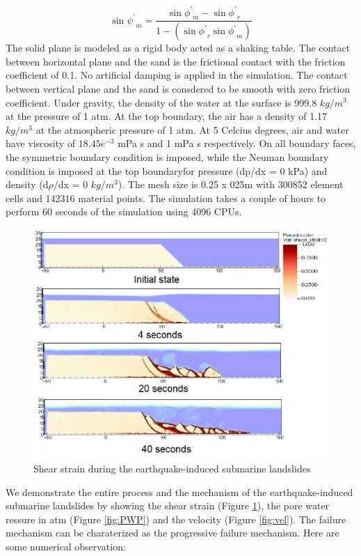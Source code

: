 \documentclass[preprint,12pt]{elsarticle}
\begin{document}
%
%
\begin{equation}
  \sin{\psi^\prime}_m = \frac{\sin{\phi^\prime}_m - \sin{\phi^\prime}_{r}}{1 - (\sin{\phi^\prime}_{r}\sin{\phi^\prime}_m)}
\end {equation}
%
%
The solid plane is modeled as a rigid body acted as a shaking table. The contact between horizontal plane and the sand is the frictional contact with the friction coefficient of 0.1. No artificial damping is applied in the simulation. The contact between vertical plane and the sand is consdered to be smooth with zero friction coefficient. Under gravity, the density of the water at the surface is 999.8 $kg/m^3$ at the pressure of 1 atm. At the top boundary, the air has a density of 1.17 $kg/m^3$ at the atmospheric pressure of 1 atm. At 5 Celcius degrees, air and water have viscosity of $18.45e^{-3}$  mPa s and 1  mPa s respectively. On all boundary faces, the symmetric boundary condition is imposed, while the Neuman boundary condition is imposed at the top boundaryfor pressure (dp/dx = 0 kPa) and density (d$\rho$/dx = 0 $kg/m^3$). The mesh size is 0.25 x 025m with 300852 element cells and 142316 material points. The simulation takes a couple of hours to perform 60 seconds of the simulation using 4096 CPUs. \\
%
\begin{figure}[H]
\center
\includegraphics[scale=0.5]{landslide_gamma.jpeg}
\caption{Shear strain during the earthquake-induced submarine landslides}
\label{fig:gamma}
\end {figure}
%
%
We demonstrate the entire process and the mechanism of the earthquake-induced submarine landslides by showing the shear strain (Figure \ref{fig:gamma}), the pore water ressure in atm (Figure \ref{fig:PWP}) and the velocity (Figure \ref{fig:vel}). The failure mechanism can be charaterized as the progressive failure mechanism. Here are some numerical observation:\\
\end{document}
